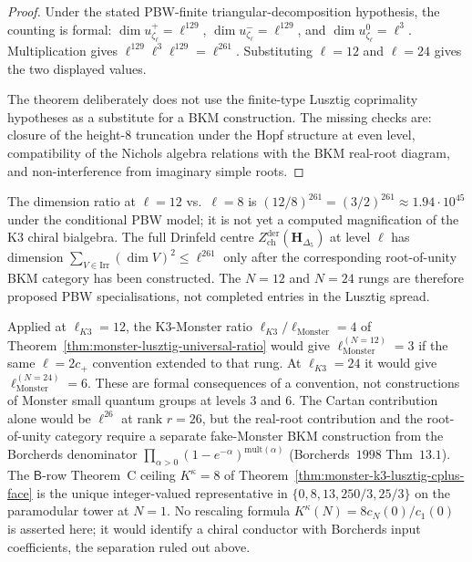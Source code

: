 \begin{proof}
Under the stated PBW-finite triangular-decomposition hypothesis,
the counting is formal:
$\dim u_{\zeta_\ell}^+=\ell^{129}$,
$\dim u_{\zeta_\ell}^-=\ell^{129}$, and
$\dim u_{\zeta_\ell}^0=\ell^3$. Multiplication gives
$\ell^{129}\ell^3\ell^{129}=\ell^{261}$. Substituting
$\ell=12$ and $\ell=24$ gives the two displayed values.

The theorem deliberately does not use the finite-type Lusztig
coprimality hypotheses as a substitute for a BKM construction. The
missing checks are: closure of the height-$8$ truncation under the
Hopf structure at even level, compatibility of the Nichols algebra
relations with the BKM real-root diagram, and non-interference from
imaginary simple roots.
\end{proof}

\begin{remark}
\label{rem:as-bkm-ladder-ell-12-24}
%
The dimension ratio at $\ell = 12$ vs.\ $\ell = 8$ is
$(12/8)^{261} = (3/2)^{261} \approx 1.94 \cdot 10^{45}$ under the
conditional PBW model; it is not yet a computed magnification of
the K$3$ chiral bialgebra. The
full Drinfeld centre $Z^{\mathrm{der}}_{\mathrm{ch}}(\mathbf
H_{\Delta_5})$ at level $\ell$ has dimension
$\sum_{V \in \mathrm{Irr}}(\dim V)^2 \le \ell^{261}$ only after
the corresponding root-of-unity BKM category has been constructed.
The $N = 12$ and $N = 24$ rungs are therefore proposed PBW
specialisations, not completed entries in the Lusztig spread.
\end{remark}

\begin{remark}
\label{rem:as-monster-ratio-ell-12-24-consequence}
%
Applied at $\ell_{K3} = 12$, the K$3$-Monster ratio
$\ell_{K3}/\ell_{\mathrm{Monster}} = 4$ of
Theorem~\ref{thm:monster-lusztig-universal-ratio} would give
$\ell_{\mathrm{Monster}}^{(N = 12)} = 3$ if the same
$\ell=2c_+$ convention extended to that rung. At $\ell_{K3}=24$ it
would give $\ell_{\mathrm{Monster}}^{(N = 24)}=6$. These are
formal consequences of a convention, not constructions of
Monster small quantum groups at levels $3$ and $6$. The Cartan
contribution alone would be $\ell^{26}$ at rank $r=26$, but the
real-root contribution and the root-of-unity category require a
separate fake-Monster BKM construction from the Borcherds
denominator
$\prod_{\alpha > 0}(1 - e^{-\alpha})^{\mathrm{mult}(\alpha)}$
(Borcherds~$1998$ Thm~$13.1$). The $\mathsf B$-row Theorem~C
ceiling $K^\kappa = 8$ of
Theorem~\ref{thm:monster-k3-lusztig-cplus-face} is the unique
integer-valued representative in $\{0, 8, 13, 250/3, 25/3\}$ on the
paramodular tower at $N = 1$. No rescaling formula
$K^\kappa(N)=8c_N(0)/c_1(0)$ is asserted here; it would identify a
chiral conductor with Borcherds input coefficients, the separation
ruled out above.
\end{remark}

